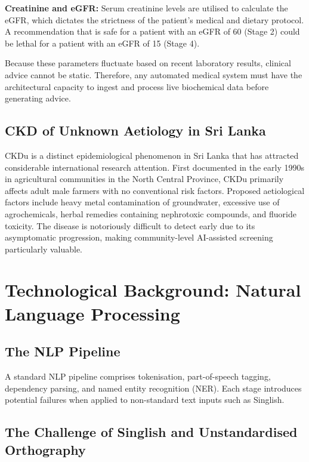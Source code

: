 \documentclass[12pt,a4paper]{report}
\begin{document}
\textbf{Creatinine and eGFR:} Serum creatinine levels are utilised to calculate the eGFR, which dictates the strictness of the patient's medical and dietary protocol. A recommendation that is safe for a patient with an eGFR of 60 (Stage 2) could be lethal for a patient with an eGFR of 15 (Stage 4).

Because these parameters fluctuate based on recent laboratory results, clinical advice cannot be static. Therefore, any automated medical system must have the architectural capacity to ingest and process live biochemical data before generating advice.

\subsection{CKD of Unknown Aetiology in Sri Lanka}

CKDu is a distinct epidemiological phenomenon in Sri Lanka that has attracted considerable international research attention. First documented in the early 1990s in agricultural communities in the North Central Province, CKDu primarily affects adult male farmers with no conventional risk factors. Proposed aetiological factors include heavy metal contamination of groundwater, excessive use of agrochemicals, herbal remedies containing nephrotoxic compounds, and fluoride toxicity. The disease is notoriously difficult to detect early due to its asymptomatic progression, making community-level AI-assisted screening particularly valuable.

\section{Technological Background: Natural Language Processing}

\subsection{The NLP Pipeline}

A standard NLP pipeline comprises tokenisation, part-of-speech tagging, dependency parsing, and named entity recognition (NER). Each stage introduces potential failures when applied to non-standard text inputs such as Singlish.

\subsection{The Challenge of Singlish and Unstandardised Orthography}
\end{document}
